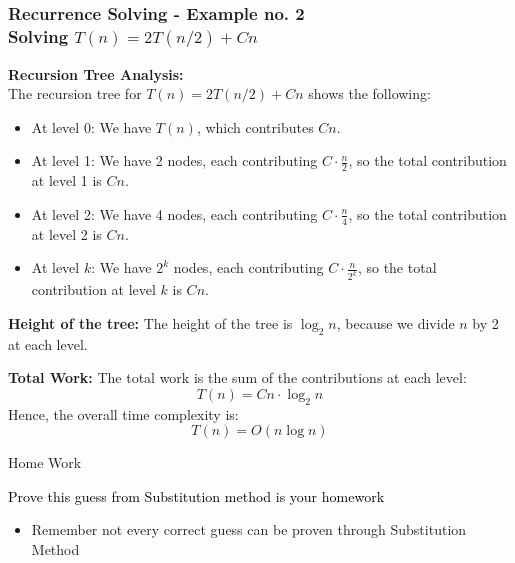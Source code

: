 \begin{frame}\frametitle{Recurrence Solving - Example no. 2\\ \small {Solving $T(n) = 2T(n/2) + Cn$}}
    \textbf{Recursion Tree Analysis:} \\
    The recursion tree for \( T(n) = 2T(n/2) + Cn \) shows the following:
    \begin{itemize}
        \item At level 0: We have \( T(n) \), which contributes \( Cn \).
        \item At level 1: We have 2 nodes, each contributing \( C \cdot \frac{n}{2} \), so the total contribution at level 1 is \( Cn \).
        \item At level 2: We have 4 nodes, each contributing \( C \cdot \frac{n}{4} \), so the total contribution at level 2 is \( Cn \).
        \item At level \( k \): We have \( 2^k \) nodes, each contributing \( C \cdot \frac{n}{2^k} \), so the total contribution at level \( k \) is \( Cn \).
    \end{itemize}

    \textbf{Height of the tree:} The height of the tree is \( \log_2 n \), because we divide \( n \) by 2 at each level.

    \textbf{Total Work:} The total work is the sum of the contributions at each level:
    \[
    T(n) = Cn \cdot \log_2 n
    \]
    Hence, the overall time complexity is:
    \[
    T(n) = O(n \log n)
    \]
\end{frame}





\begin{frame}{Home Work}


\begin{block}{\textcolor{black}{Prove this guess from Substitution method is your homework}}

    \end{block}

    \begin{itemize}
        \item Remember not every correct guess can be proven through Substitution Method
    \end{itemize}
    

\end{frame}

